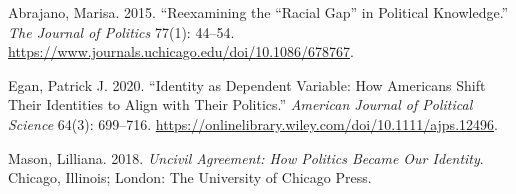 \documentclass[
  11pt,
]{article}
\newlength{\cslhangindent}
\newlength{\cslentryspacingunit} %
\newenvironment{CSLReferences}[2] %
 {%
  \setlength{\parindent}{0pt}
  \ifodd #1
  \let\oldpar\par
  \def\par{\hangindent=\cslhangindent\oldpar}
  \fi
  \setlength{\parskip}{#2\cslentryspacingunit}
 }%
 {}
\begin{document}
\hypertarget{refs}{}
\begin{CSLReferences}{1}{0}
\leavevmode{}%
Abrajano, Marisa. 2015. {``Reexamining the {``}Racial Gap{''} in
Political Knowledge.''} \emph{The Journal of Politics} 77(1): 44--54.
\url{https://www.journals.uchicago.edu/doi/10.1086/678767}.

\leavevmode{}%
Egan, Patrick J. 2020. {``Identity as Dependent Variable: How Americans
Shift Their Identities to Align with Their Politics.''} \emph{American
Journal of Political Science} 64(3): 699--716.
\url{https://onlinelibrary.wiley.com/doi/10.1111/ajps.12496}.

\leavevmode{}%
Mason, Lilliana. 2018. \emph{Uncivil Agreement: How Politics Became Our
Identity}. Chicago, Illinois; London: The University of Chicago Press.

\end{CSLReferences}
\end{document}
